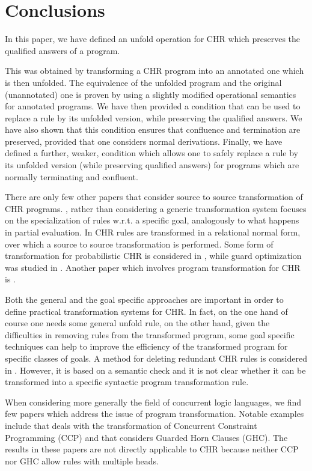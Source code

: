 \documentclass{tlp}
\begin{document}
\section{Conclusions}\label{sec:conclusion_and_future}

In this paper, we have defined an unfold operation for CHR which preserves the qualified answers of a program.

This was obtained by transforming a CHR program into an
annotated one which is then unfolded. The equivalence of the unfolded
program and the original (unannotated) one is proven by using  a slightly modified operational semantics for annotated programs.
We have then provided a condition that can be used to replace a
rule by its unfolded version, while preserving the qualified answers. We have also shown that this condition ensures that confluence and termination are preserved, provided that one considers normal derivations. Finally,
we have defined a further, weaker, condition which allows one to safely replace a rule by its unfolded version (while preserving qualified answers) for programs which are normally terminating and confluent.

There are only few other papers that consider source to source transformation
of CHR programs. \cite{Fru04}, rather than considering a generic transformation
system focuses on the specialization of rules w.r.t. a specific goal, analogously
to what happens in partial evaluation. In \cite{FH03} CHR rules are transformed
in a relational normal form, over which a source to source transformation is performed. Some form of
transformation for probabilistic CHR is considered in \cite{WFLP02}, while
guard optimization was studied in \cite{SSD05b}. Another paper which involves program transformation
for CHR is \cite{SS09}.

Both the general and the goal specific approaches are important in order
to define practical transformation systems for CHR. In fact, on the
one hand of course one needs some general unfold rule, on the other
hand, given the difficulties in removing rules from the transformed
program, some goal specific techniques can help to improve the
efficiency of the transformed program for specific classes of
goals. A method for deleting redundant CHR rules is considered
in \cite{AF04}. However, it is based on a semantic check and it
is not clear whether it can be transformed into a specific syntactic
program transformation rule.

When considering more generally the field of concurrent logic
languages, we find few papers which address the issue of program
transformation. Notable examples include  \cite{EGM01} that deals with
the transformation of  Concurrent Constraint Programming (CCP) and
\cite{UF88} that considers Guarded Horn Clauses (GHC).  The
results in these papers are not directly applicable to CHR  because
neither CCP nor GHC allow rules with multiple heads.
\end{document}
